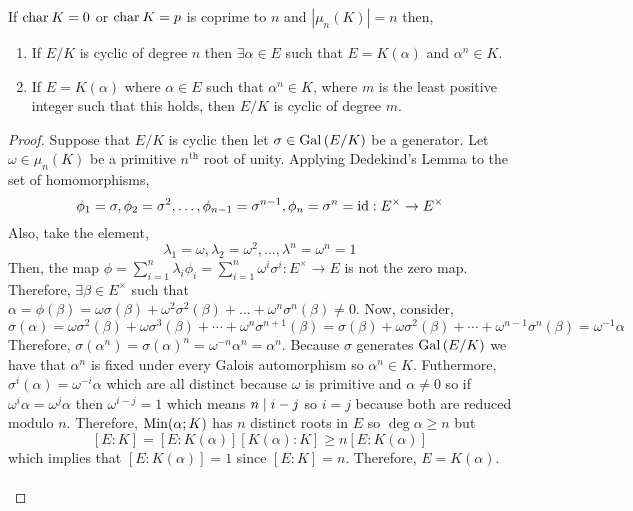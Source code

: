 \documentclass[12pt]{extarticle}
\begin{document}
\begin{theorem}
If $\mathrm{char} \: K = 0$ or $\mathrm{char} \: K = p$ is coprime to $n$ and $|\mu_n(K)| = n$ then,
\begin{enumerate}
\item If $E/K$ is cyclic of degree $n$ then $\exists \alpha \in E$ such that $E = K(\alpha)$ and $\alpha^n \in K$.
\item If $E = K(\alpha)$ where $\alpha \in E$ such that $\alpha^n \in K$, where $m$ is the least positive integer such that this holds, then $E/K$ is cyclic of degree $m$.
\end{enumerate}
\end{theorem}

\begin{proof}
Suppose that $E/K$ is cyclic then let $\sigma \in \mathrm{Gal}\left( E/K \right)$ be a generator. Let $\omega \in \mu_n(K)$ be a primitive $n^{\mathrm{th}}$ root of unity. Applying Dedekind's Lemma to the set of homomorphisms,
\[\phi_1 = \sigma, \phi_2 = \sigma^2, \dots, \phi_{n-1} = \sigma^{n-1}, \phi_n =  \sigma^n = \mathrm{id} : E^{\times} \to E^{\times}\] Also, take the element,
\[\lambda_1 = \omega, \lambda_2 = \omega^2, \dots, \lambda^n = \omega^n = 1\]
Then, the map $\phi = \sum\limits_{i = 1}^n \lambda_i \phi_i = \sum\limits_{i = 1}^n \omega^i \sigma^i : E^\times \to E$ is not the zero map. Therefore, $\exists \beta \in E^\times$ such that $\alpha = \phi(\beta) = \omega \sigma(\beta) + \omega^2 \sigma^2(\beta) + \dots + \omega^n \sigma^n(\beta) \neq 0$. Now, consider,
\[\sigma(\alpha) = \omega \sigma^2(\beta) + \omega \sigma^3(\beta) + \cdots + \omega^n \sigma^{n+1}(\beta) = \sigma(\beta) + \omega \sigma^2(\beta) + \cdots + \omega^{n-1} \sigma^n(\beta) = \omega^{-1} \alpha\] 
Therefore, $\sigma(\alpha^n) = \sigma(\alpha)^n = \omega^{-n} \alpha^n = \alpha^n$. Because $\sigma$ generates $\mathrm{Gal}\left( E/K \right)$ we have that $\alpha^n$ is fixed under every Galois automorphism so $\alpha^n \in K$. Futhermore, $\sigma^i(\alpha) = \omega^{-i} \alpha$ which are all distinct because $\omega$ is primitive and $\alpha \neq 0$ so if $\omega^i \alpha = \omega^j \alpha$ then $\omega^{i-j} = 1$ which means $n \mid i - j$ so $i = j$ because both are reduced modulo $n$. Therefore, $\mathrm{Min}(\alpha;K)$ has $n$ distinct roots in $E$ so $\deg{\alpha} \ge n$ but \[[E : K] = [E : K(\alpha)] [K(\alpha) : K] \ge n [E : K(\alpha)]\] which implies that $[E : K(\alpha)] = 1$ since $[E : K] = n$. Therefore, $E = K(\alpha)$. \bigskip \\\\

\end{proof}
\end{document}
